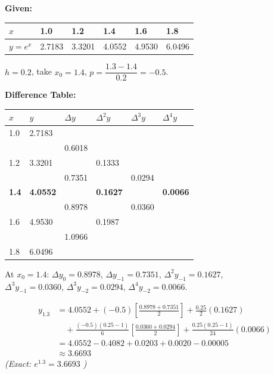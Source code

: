 \documentclass[12pt]{article}
\newcommand{\hcell}[1]{\textbf{\color{white}#1}}
\begin{document}
\begin{examplebox*}
\textbf{Given:}
\begin{center}
\begin{tabular}{C{1.4cm} C{1.6cm} C{1.6cm} C{1.6cm} C{1.6cm} C{1.6cm}}
\toprule
{}
\hcell{$x$} & \hcell{1.0} & \hcell{1.2} & \hcell{1.4} & \hcell{1.6} & \hcell{1.8} \\
\midrule
$y = e^x$ & 2.7183 & 3.3201 & 4.0552 & 4.9530 & 6.0496 \\
\bottomrule
\end{tabular}
\end{center}

$h = 0.2$,\; take $x_0 = 1.4$,\; $p = \dfrac{1.3 - 1.4}{0.2} = -0.5$.

\medskip\textbf{Difference Table:}
\begin{center}
\renewcommand{\arraystretch}{1.3}
\begin{tabular}{C{1.2cm} C{1.6cm} C{1.6cm} C{1.6cm} C{1.6cm} C{1.6cm}}
\toprule
{}
\hcell{$x$} & \hcell{$y$} & \hcell{$\Delta y$} & \hcell{$\Delta^2 y$} & \hcell{$\Delta^3 y$} & \hcell{$\Delta^4 y$} \\
 & 2.7183 & & & & \\
 & & 0.6018 & & & \\
1.2 & 3.3201 & & 0.1333 & & \\
 & & 0.7351 & & 0.0294 & \\
\textbf{1.4} & \textbf{4.0552} & & \textbf{0.1627} & & \textbf{0.0066} \\
 & & 0.8978 & & 0.0360 & \\
1.6 & 4.9530 & & 0.1987 & & \\
 & & 1.0966 & & & \\
1.8 & 6.0496 & & & & \\
\bottomrule
\end{tabular}
\end{center}

At $x_0 = 1.4$: $\Delta y_0 = 0.8978$,\; $\Delta y_{-1} = 0.7351$,\; $\Delta^2 y_{-1} = 0.1627$,\\
$\Delta^3 y_{-1} = 0.0360$,\; $\Delta^3 y_{-2} = 0.0294$,\; $\Delta^4 y_{-2} = 0.0066$.

\begin{align*}
y_{1.3} &= 4.0552 + (-0.5)\!\left[\frac{0.8978+0.7351}{2}\right]
+ \frac{0.25}{2}(0.1627)\\[4pt]
&\quad + \frac{(-0.5)(0.25-1)}{6}\!\left[\frac{0.0360+0.0294}{2}\right]
+ \frac{0.25(0.25-1)}{24}(0.0066)\\[4pt]
&= 4.0552 - 0.4082 + 0.0203 + 0.0020 - 0.00005 \\[4pt]
&\approx \boxed{3.6693}
\end{align*}
\textit{(Exact: $e^{1.3} = 3.6693$ \checkmark)}
\end{examplebox*}
\end{document}

